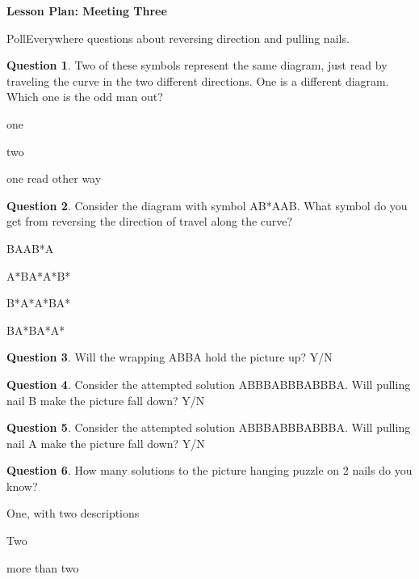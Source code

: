 \documentclass[12pt]{amsart}
\theoremstyle{definition}
\newtheorem{question}{Question}
\begin{document}
\begin{center}
\textbf{\Huge
Lesson Plan: Meeting Three
}
\end{center}
\vspace{.5in}

PollEverywhere questions about reversing direction and pulling nails.

\begin{question} Two of these symbols represent the same diagram, just read by traveling the curve in the two different directions. One is a different diagram. Which one is the odd man out?
    \begin{compactitem}
    \item one
    \item two
    \item one read other way
    \end{compactitem}
\end{question}

\begin{question} Consider the diagram with symbol AB*AAB. What symbol do you get from reversing the direction of travel along the curve?
    \begin{compactitem}
    \item BAAB*A
    \item A*BA*A*B*
    \item B*A*A*BA*
    \item BA*BA*A*
    \end{compactitem}
\end{question}

\begin{question} Will the wrapping ABB\*A\* hold the picture up?  Y/N
\end{question}

\begin{question} 
Consider the attempted solution ABBBA\*BBBA\*B\*B\*B\*A. Will pulling nail B make the picture fall down? Y/N
\end{question}

\begin{question} 
Consider the attempted solution ABBBA\*BBBA\*B\*B\*B\*A. Will pulling nail A make the picture fall down? Y/N
\end{question}

\begin{question} How many solutions to the picture hanging puzzle on 2 nails do you know?
    \begin{compactitem}
    \item One, with two descriptions
    \item Two
    \item more than two
    \end{compactitem}
\end{question}
\end{document}
